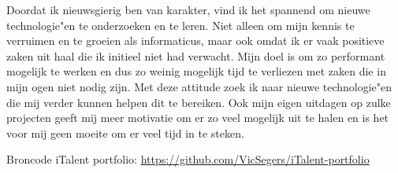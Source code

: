 Doordat ik nieuwsgierig ben van karakter, vind ik het spannend om nieuwe technologie"en te onderzoeken en te leren. Niet alleen om mijn kennis te verruimen en te groeien als informaticus, maar ook omdat ik er vaak positieve zaken uit haal die ik initieel niet had verwacht. Mijn doel is om zo performant mogelijk te werken en dus zo weinig mogelijk tijd te verliezen met zaken die in mijn ogen niet nodig zijn. Met deze attitude zoek ik naar nieuwe technologie"en die mij verder kunnen helpen dit te bereiken. Ook mijn eigen uitdagen op zulke projecten geeft mij meer motivatie om er zo veel mogelijk uit te halen en is het voor mij geen moeite om er veel tijd in te steken.

Broncode iTalent portfolio: \url{https://github.com/VicSegers/iTalent-portfolio}